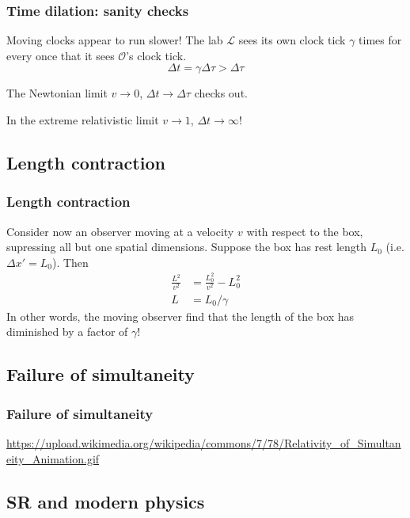 \documentclass{beamer}
\begin{document}
\begin{frame}
    \frametitle{Time dilation: sanity checks}
    Moving clocks appear to run slower! The lab $\mathcal{L}$ sees its own clock tick $\gamma$ times
    for every once that it sees $\mathcal{O}$'s clock tick.
    \[\Delta t=\gamma\Delta \tau>\Delta \tau\]

    The Newtonian limit $v\to 0$, $\Delta t\to \Delta \tau$ checks out.

    In the extreme relativistic limit $v\to 1$, $\Delta t\to \infty$!
\end{frame}

\subsection{Length contraction}

\begin{frame}
    \frametitle{Length contraction}
    Consider now an observer moving at a velocity $v$ with respect to the box, supressing all but one spatial dimensions.
    Suppose the box has rest length $L_0$ (i.e. $\Delta x'=L_0$). Then
    \begin{align*}
        \frac{L^2}{v^2}&=\frac{L_0^2}{v^2}-L_0^2\\
        L&=L_0/\gamma
    \end{align*}
    In other words, the moving observer find that the length of the box has diminished by a factor of $\gamma$!
\end{frame}

\subsection{Failure of simultaneity}

\begin{frame}
    \frametitle{Failure of simultaneity}
    \url{https://upload.wikimedia.org/wikipedia/commons/7/78/Relativity_of_Simultaneity_Animation.gif}
\end{frame}

\subsection{SR and modern physics}
\end{document}
